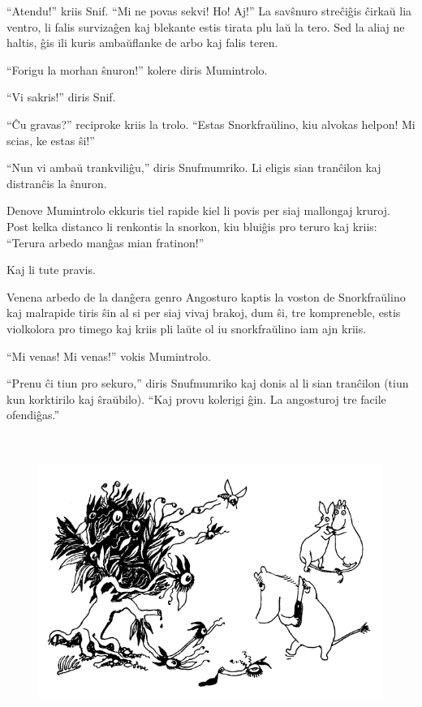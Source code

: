 ``Atendu!'' kriis Snif. ``Mi ne povas sekvi! Ho! Aj!'' La savŝnuro streĉiĝis ĉirkaŭ lia ventro, li falis survizaĝen kaj blekante estis tirata plu laŭ la tero. Sed la aliaj ne haltis, ĝis ili kuris ambaŭflanke de arbo kaj falis teren.

``Forigu la morhan ŝnuron!'' kolere diris Mumintrolo.

``Vi sakris!'' diris Snif.

``Ĉu gravas?'' reciproke kriis la trolo. ``Estas Snorkfraŭlino, kiu alvokas helpon! Mi scias, ke estas ŝi!''

``Nun vi ambaŭ trankviliĝu,'' diris Snufmumriko. Li eligis sian tranĉilon kaj distranĉis la ŝnuron.

Denove Mumintrolo ekkuris tiel rapide kiel li povis per siaj mallongaj kruroj. Post kelka distanco li renkontis la snorkon, kiu bluiĝis pro teruro kaj kriis: ``Terura arbedo manĝas mian fratinon!''

Kaj li tute pravis.

Venena arbedo de la danĝera genro Angosturo kaptis la voston de Snorkfraŭlino kaj malrapide tiris ŝin al si per siaj vivaj brakoj, dum ŝi, tre kompreneble, estis violkolora pro timego kaj kriis pli laŭte ol iu snorkfraŭlino iam ajn kriis.

``Mi venas! Mi venas!'' vokis Mumintrolo.

``Prenu ĉi tiun pro sekuro,'' diris Snufmumriko kaj donis al li sian tranĉilon (tiun kun korktirilo kaj ŝraŭbilo). ``Kaj provu kolerigi ĝin. La angosturoj tre facile ofendiĝas.''

\begin{figure}[htbp]
\centering
\includegraphics[width=400pt,height=274pt]{5-4.png}
\caption{}
\label{5-4}
\end{figure}

